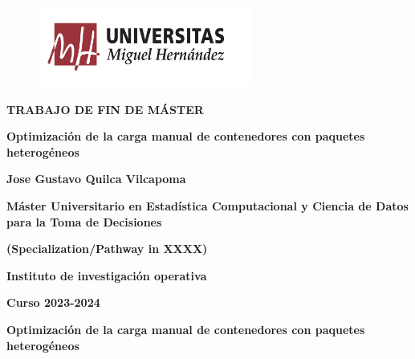 \documentclass[openany]{article}
\begin{document}

\thispagestyle{empty}

\begin{titlepage}
    \begin{figure}[th]
        \begin{flushleft}
            \includegraphics[width=7cm]{Figures/image1.png}
        \end{flushleft}
    \end{figure}
    \vspace{1cm}

    {\flushleft \LARGE \bfseries TRABAJO DE FIN DE MÁSTER\par}\vspace{2cm}

    {\flushright \LARGE \bfseries Optimización de la carga manual de contenedores con paquetes heterogéneos  \par}\vspace{2cm}

    {\flushleft \LARGE \bfseries Jose Gustavo Quilca Vilcapoma \par}\vspace{1.5cm}

    {\flushleft \bfseries Máster Universitario en Estadística Computacional y Ciencia de Datos para la Toma de Decisiones\par}\vspace{0.cm}
    {\flushleft \bfseries (Specialization/Pathway in XXXX)\par}\vspace{0.cm}
    {\flushleft \bfseries Instituto de investigación operativa\par}\vspace{1cm}

    {\flushleft \small \bfseries Curso 2023-2024\par}\vspace{2cm}

    \newpage\thispagestyle{empty}

    {\flushleft \LARGE \bfseries Optimización de la carga manual de contenedores con paquetes heterogéneos \par} \vspace{1.5cm}


\end{titlepage}
\end{document}

